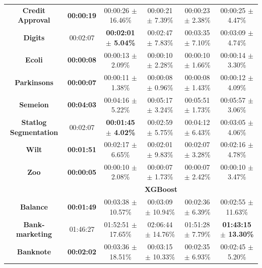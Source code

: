 \documentclass[preprint,12pt]{elsarticle}
\begin{document}
\begin{table}
{\begin{tabular}{cccccc}
\textbf{Credit   Approval}      & \textbf{00:00:19} & 00:00:26 $\pm$ 16.46\%          & 00:00:21 $\pm$ 7.39\%      & 00:00:23 $\pm$ 2.38\%          & 00:00:25 $\pm$ 4.47\%           \\
\textbf{Digits}                 & 00:02:07          & \textbf{00:02:01 $\pm$ 5.04\%}  & 00:02:47 $\pm$ 7.83\%      & 00:03:35 $\pm$ 7.10\%          & 00:03:09 $\pm$ 4.74\%           \\
\textbf{Ecoli}                  & \textbf{00:00:08} & 00:00:13 $\pm$ 2.09\%           & 00:00:10 $\pm$ 2.28\%      & 00:00:10 $\pm$ 1.66\%          & 00:00:14 $\pm$ 3.30\%           \\
\textbf{Parkinsons}             & \textbf{00:00:07} & 00:00:11 $\pm$ 1.38\%           & 00:00:08 $\pm$ 0.96\%      & 00:00:08 $\pm$ 1.43\%          & 00:00:12 $\pm$ 4.09\%           \\
\textbf{Semeion}                & \textbf{00:04:03} & 00:04:16 $\pm$ 5.22\%           & 00:05:17 $\pm$ 3.24\%      & 00:05:51 $\pm$ 1.73\%          & 00:05:57 $\pm$ 3.06\%           \\
\textbf{Statlog   Segmentation} & 00:02:07          & \textbf{00:01:45 $\pm$ 4.02\%}  & 00:02:59 $\pm$ 5.75\%      & 00:04:12 $\pm$ 6.43\%          & 00:03:05 $\pm$ 4.06\%           \\
\textbf{Wilt}                   & \textbf{00:01:51} & 00:02:17 $\pm$ 6.65\%           & 00:02:01 $\pm$ 9.83\%      & 00:02:07 $\pm$ 3.28\%          & 00:02:16 $\pm$ 4.78\%           \\
\textbf{Zoo}                    & \textbf{00:00:05} & 00:00:10 $\pm$ 2.08\%           & 00:00:07 $\pm$ 1.73\%      & 00:00:07 $\pm$ 2.42\%          & 00:00:10 $\pm$ 3.47\%           \\ \hline
                                & \multicolumn{5}{c}{\textbf{XGBoost}}                                                                                                \\ \hline
\textbf{Balance}                & \textbf{00:01:49} & 00:03:38 $\pm$ 10.57\%          & 00:03:09 $\pm$ 10.94\%     & 00:02:36 $\pm$ 6.39\%          & 00:02:55 $\pm$ 11.63\%          \\
\textbf{Bank-marketing}         & 01:46:27          & 01:52:51 $\pm$ 17.65\%          & 02:06:44 $\pm$ 14.76\%     & 01:51:28 $\pm$ 7.79\%          & \textbf{01:43:15 $\pm$ 13.30\%} \\
\textbf{Banknote}               & \textbf{00:02:02} & 00:03:36 $\pm$ 18.51\%          & 00:03:15 $\pm$ 10.33\%     & 00:02:35 $\pm$ 6.93\%          & 00:02:45 $\pm$ 5.20\%           \\

\end{tabular}}
\end{table}
\end{document}
